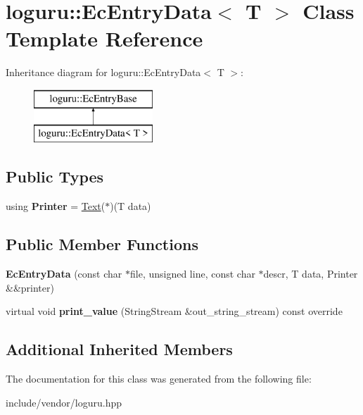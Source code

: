 \hypertarget{classloguru_1_1_ec_entry_data}{}\section{loguru\+:\+:Ec\+Entry\+Data$<$ T $>$ Class Template Reference}
\label{classloguru_1_1_ec_entry_data}
Inheritance diagram for loguru\+:\+:Ec\+Entry\+Data$<$ T $>$\+:\begin{figure}[H]
\begin{center}
\leavevmode
\includegraphics[height=2.000000cm]{dd/dc4/classloguru_1_1_ec_entry_data}
\end{center}
\end{figure}
\subsection*{Public Types}
\begin{DoxyCompactItemize}
\item 
\mbox{\label{classloguru_1_1_ec_entry_data_a4e4738a2eb975b3c15a66858cf7f8629}} 
using {\bfseries Printer} = \mbox{\hyperlink{classloguru_1_1_text}{Text}}($\ast$)(T data)
\end{DoxyCompactItemize}
\subsection*{Public Member Functions}
\begin{DoxyCompactItemize}
\item 
\mbox{\label{classloguru_1_1_ec_entry_data_a856a0f7c19c5e3bfb7c949d267e4482a}} 
{\bfseries Ec\+Entry\+Data} (const char $\ast$file, unsigned line, const char $\ast$descr, T data, Printer \&\&printer)
\item 
\mbox{\label{classloguru_1_1_ec_entry_data_a4979a8172502122c764e8146c51e01a9}} 
virtual void {\bfseries print\+\_\+value} (String\+Stream \&out\+\_\+string\+\_\+stream) const override
\end{DoxyCompactItemize}
\subsection*{Additional Inherited Members}


The documentation for this class was generated from the following file\+:\begin{DoxyCompactItemize}
\item 
include/vendor/loguru.\+hpp\end{DoxyCompactItemize}
